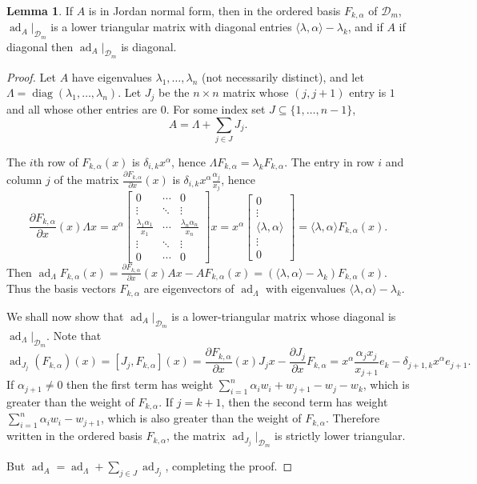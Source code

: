 \documentclass{article}
\theoremstyle{definition}
\newtheorem{lemma}[theorem]{Lemma}
\newcommand{\diag}{\operatorname{diag}}
\newcommand{\ad}{\operatorname{ad}}
\begin{document}
\begin{lemma}
\label{monomialbasis}
If $A$ is in Jordan normal form, then in the ordered basis $F_{k,\alpha}$ of $\mathscr{D}_m$, $\ad_A|_{\mathscr{D}_m}$ is a lower triangular matrix with diagonal entries
$\langle \lambda,\alpha \rangle -\lambda_k$, and if $A$ if diagonal then $\ad_A|_{\mathscr{D}_m}$ is diagonal.
\end{lemma}
\begin{proof}
Let $A$ have eigenvalues $\lambda_1,\ldots,\lambda_n$ (not necessarily distinct), and let $\Lambda=\diag(\lambda_1,\ldots,\lambda_n)$. Let $J_j$ be the $n \times n$ matrix whose $(j,j+1)$ entry is $1$ and all whose
other entries are $0$. For some index set $J \subseteq \{1,\ldots,n-1\}$,
\[
A=\Lambda+\sum_{j \in J} J_j.
\]

The $i$th row of $F_{k,\alpha}(x)$ is $\delta_{i,k} x^\alpha$, 
hence $\Lambda F_{k,\alpha}=
\lambda_k F_{k,\alpha}$. The entry in
row $i$ and column $j$ of the matrix $\frac{\partial F_{k,\alpha}}{\partial x}(x)$
is $\delta_{i,k} x^\alpha \frac{\alpha_j}{x_j}$,
hence
\[
\frac{\partial F_{k,\alpha}}{\partial x}(x) \Lambda x
=x^\alpha \begin{bmatrix}0&\cdots&0\\
\vdots&\ddots&\vdots\\
\frac{\lambda_1 \alpha_1}{x_1}&\cdots&\frac{\lambda_n \alpha_n}{x_n}\\
\vdots&\ddots&\vdots\\
0&\cdots&0
\end{bmatrix}x
=x^\alpha \begin{bmatrix}0\\ \vdots \\ \langle \lambda,\alpha \rangle \\ \vdots \\ 0 \end{bmatrix}
=
\langle \lambda,\alpha \rangle F_{k,\alpha}(x).
\]
Then $\ad_\Lambda F_{k,\alpha}(x)=\frac{\partial F_{k,\alpha}}{\partial x}(x)Ax
-AF_{k,\alpha}(x)=(\langle \lambda,\alpha \rangle -\lambda_k) F_{k,\alpha}(x)$. Thus the basis vectors $F_{k,\alpha}$ are eigenvectors of $\ad_\Lambda$ with  eigenvalues $\langle \lambda,\alpha \rangle -\lambda_k$.

We shall now show that $\ad_A|_{\mathscr{D}_m}$ is a lower-triangular matrix whose diagonal
is $\ad_\Lambda|_{\mathscr{D}_m}$. Note that
\[
\ad_{J_j}(F_{k,\alpha})(x)=[J_j,F_{k,\alpha}](x)=\frac{\partial F_{k,\alpha}}{\partial x}(x) J_jx-\frac{\partial J_j}{\partial x}F_{k,\alpha}
=x^\alpha \frac{\alpha_j x_j}{x_{j+1}} e_k-\delta_{j+1,k} x^\alpha e_{j+1}.
\]
If $\alpha_{j+1} \neq 0$ then the first term has weight $\sum_{i=1}^n \alpha_i w_i+ w_{j+1} -w_j -w_k$, which is greater
than the weight of $F_{k,\alpha}$. If $j=k+1$, then the second term has weight $\sum_{i=1}^n \alpha_i w_i -w_{j+1}$, which is also greater than the weight of $F_{k,\alpha}$. Therefore written in the ordered basis $F_{k,\alpha}$, the matrix
$\ad_{J_j}|_{\mathscr{D}_m}$ is strictly lower triangular. 

But $\ad_A=\ad_\Lambda+\sum_{j \in J} \ad_{J_j}$, completing the proof.
\end{proof}
\end{document}
